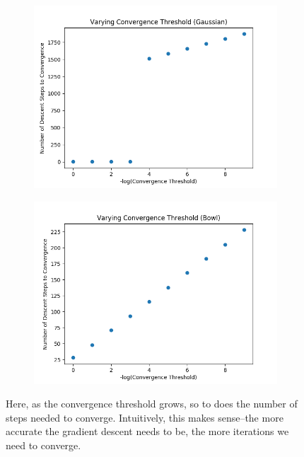 \documentclass{article}
\begin{document}
\begin{figure}[H]
\centering
        \begin{subfigure}[b]{0.4\textwidth}
                \includegraphics[width=\linewidth]{../P1/figs/converge_gauss.png}
        \end{subfigure}%
        \begin{subfigure}[b]{0.4\textwidth}
                \includegraphics[width=\linewidth]{../P1/figs/converge_bowl.png}
        \end{subfigure}%
\caption*{Here, as the convergence threshold grows, so to does the number of steps needed to converge. Intuitively, this makes sense--the more accurate the gradient descent needs to be, the more iterations we need to converge.}
\end{figure}
\end{document}
